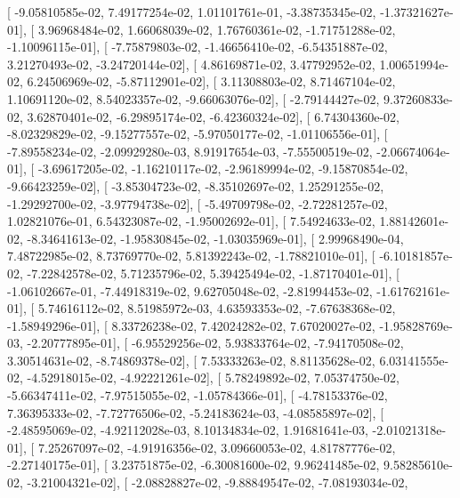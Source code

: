 \documentclass{article}
\begin{document}
       [ -9.05810585e-02,   7.49177254e-02,   1.01101761e-01,
         -3.38735345e-02,  -1.37321627e-01],
       [  3.96968484e-02,   1.66068039e-02,   1.76760361e-02,
         -1.71751288e-02,  -1.10096115e-01],
       [ -7.75879803e-02,  -1.46656410e-02,  -6.54351887e-02,
          3.21270493e-02,  -3.24720144e-02],
       [  4.86169871e-02,   3.47792952e-02,   1.00651994e-02,
          6.24506969e-02,  -5.87112901e-02],
       [  3.11308803e-02,   8.71467104e-02,   1.10691120e-02,
          8.54023357e-02,  -9.66063076e-02],
       [ -2.79144427e-02,   9.37260833e-02,   3.62870401e-02,
         -6.29895174e-02,  -6.42360324e-02],
       [  6.74304360e-02,  -8.02329829e-02,  -9.15277557e-02,
         -5.97050177e-02,  -1.01106556e-01],
       [ -7.89558234e-02,  -2.09929280e-03,   8.91917654e-03,
         -7.55500519e-02,  -2.06674064e-01],
       [ -3.69617205e-02,  -1.16210117e-02,  -2.96189994e-02,
         -9.15870854e-02,  -9.66423259e-02],
       [ -3.85304723e-02,  -8.35102697e-02,   1.25291255e-02,
         -1.29292700e-02,  -3.97794738e-02],
       [ -5.49709798e-02,  -2.72281257e-02,   1.02821076e-01,
          6.54323087e-02,  -1.95002692e-01],
       [  7.54924633e-02,   1.88142601e-02,  -8.34641613e-02,
         -1.95830845e-02,  -1.03035969e-01],
       [  2.99968490e-04,   7.48722985e-02,   8.73769770e-02,
          5.81392243e-02,  -1.78821010e-01],
       [ -6.10181857e-02,  -7.22842578e-02,   5.71235796e-02,
          5.39425494e-02,  -1.87170401e-01],
       [ -1.06102667e-01,  -7.44918319e-02,   9.62705048e-02,
         -2.81994453e-02,  -1.61762161e-01],
       [  5.74616112e-02,   8.51985972e-03,   4.63593353e-02,
         -7.67638368e-02,  -1.58949296e-01],
       [  8.33726238e-02,   7.42024282e-02,   7.67020027e-02,
         -1.95828769e-03,  -2.20777895e-01],
       [ -6.95529256e-02,   5.93833764e-02,  -7.94170508e-02,
          3.30514631e-02,  -8.74869378e-02],
       [  7.53333263e-02,   8.81135628e-02,   6.03141555e-02,
         -4.52918015e-02,  -4.92221261e-02],
       [  5.78249892e-02,   7.05374750e-02,  -5.66347411e-02,
         -7.97515055e-02,  -1.05784366e-01],
       [ -4.78153376e-02,   7.36395333e-02,  -7.72776506e-02,
         -5.24183624e-03,  -4.08585897e-02],
       [ -2.48595069e-02,  -4.92112028e-03,   8.10134834e-02,
          1.91681641e-03,  -2.01021318e-01],
       [  7.25267097e-02,  -4.91916356e-02,   3.09660053e-02,
          4.81787776e-02,  -2.27140175e-01],
       [  3.23751875e-02,  -6.30081600e-02,   9.96241485e-02,
          9.58285610e-02,  -3.21004321e-02],
       [ -2.08828827e-02,  -9.88849547e-02,  -7.08193034e-02,
\end{document}
